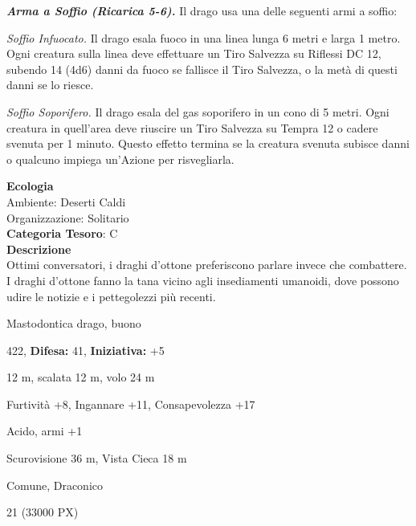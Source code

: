 \begin{multicols}{2}
{\emph{\textbf{Arma a Soffio (Ricarica 5-6).}} Il drago usa una delle seguenti armi a soffio:

\emph{Soffio Infuocato.} Il drago esala fuoco in una linea lunga 6 metri e larga 1 metro. Ogni creatura sulla linea deve effettuare un Tiro Salvezza su Riflessi DC 12, subendo 14 (4d6) danni da fuoco se fallisce il Tiro Salvezza, o la metà di questi danni se lo riesce.

\emph{Soffio Soporifero.} Il drago esala del gas soporifero in un cono di 5 metri. Ogni creatura in quell'area deve riuscire un Tiro Salvezza su Tempra 12 o cadere svenuta per 1 minuto. Questo effetto termina se la creatura svenuta subisce danni o qualcuno impiega un'Azione per risvegliarla.

\textbf{Ecologia}\\
Ambiente: Deserti Caldi\\
Organizzazione: Solitario\\
\textbf{Categoria Tesoro}: C\\
\textbf{Descrizione}\\
Ottimi conversatori, i draghi d'ottone preferiscono parlare invece che combattere. I draghi d'ottone fanno la tana vicino agli insediamenti umanoidi, dove possono udire le notizie e i pettegolezzi più recenti.

\noindent
\begin{description}[noitemsep, topsep=0pt, parsep=0pt, partopsep=0pt, leftmargin=0cm, labelwidth=2.2cm]
	\item[\textbf{Taglia/Tipo:}] Mastodontica drago, buono
	\item[\textbf{Caratt.:}] 
	\item[\textbf{Punti Ferita:}] 422,  \textbf{Difesa:} 41,  \textbf{Iniziativa:} +5
	\item[\textbf{Movimento:}] 12 m, scalata 12 m, volo 24 m
	\item[\textbf{Tiri Salvez.:}] 
	\item[\textbf{Comp.:}] Furtività +8, Ingannare +11, Consapevolezza +17
	\item[\textbf{Imm. Danni:}] Acido, armi +1
	\item[\textbf{Sensi:}] Scurovisione 36 m, Vista Cieca 18 m
	\item[\textbf{Linguaggi:}] Comune, Draconico
	\item[\textbf{Sfida:}] 21 (33000 PX)\smallskip
\end{description}

}
\end{multicols}
